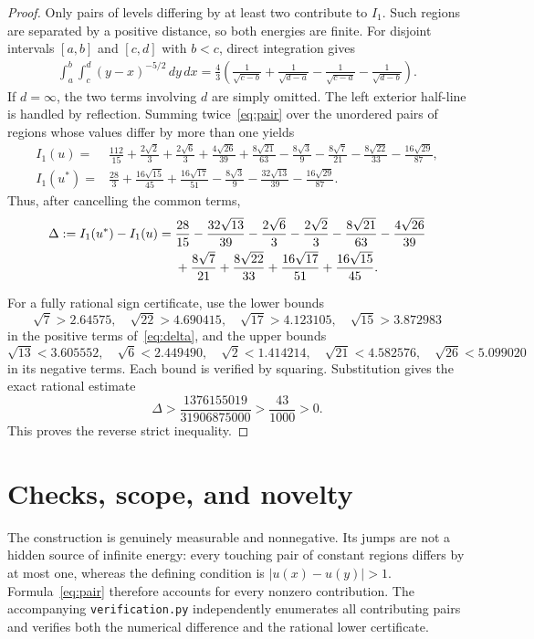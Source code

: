 \documentclass[11pt]{article}
\begin{document}
\begin{proof}
Only pairs of levels differing by at least two contribute to $I_1$.  Such
regions are separated by a positive distance, so both energies are finite.
For disjoint intervals $[a,b]$ and $[c,d]$ with $b<c$, direct integration
gives
\begin{align}\label{eq:pair}
 \int_a^b\int_c^d (y-x)^{-5/2}\,dy\,dx
 =\frac43\left(
 \frac1{\sqrt{c-b}}+\frac1{\sqrt{d-a}}
 -\frac1{\sqrt{c-a}}-\frac1{\sqrt{d-b}}
 \right).
\end{align}
If $d=\infty$, the two terms involving $d$ are simply omitted.  The left
exterior half-line is handled by reflection.  Summing twice~\eqref{eq:pair}
over the unordered pairs of regions whose values differ by more than one
yields
\begin{align*}
I_1(u)={}&\frac{112}{15}+\frac{2\sqrt2}{3}+\frac{2\sqrt6}{3}
+\frac{4\sqrt{26}}{39}+\frac{8\sqrt{21}}{63}
-\frac{8\sqrt3}{9}-\frac{8\sqrt7}{21}-\frac{8\sqrt{22}}{33}
-\frac{16\sqrt{29}}{87},\\
I_1(u^*)={}&\frac{28}{3}+\frac{16\sqrt{15}}{45}
+\frac{16\sqrt{17}}{51}-\frac{8\sqrt3}{9}
-\frac{32\sqrt{13}}{39}-\frac{16\sqrt{29}}{87}.
\end{align*}
Thus, after cancelling the common terms,
\begin{align}\label{eq:delta}
\Delta:=I_1(u^*)-I_1(u)
={}&\frac{28}{15}
-\frac{32\sqrt{13}}{39}-\frac{2\sqrt6}{3}-\frac{2\sqrt2}{3}
-\frac{8\sqrt{21}}{63}-\frac{4\sqrt{26}}{39} \notag\\
&+\frac{8\sqrt7}{21}+\frac{8\sqrt{22}}{33}
+\frac{16\sqrt{17}}{51}+\frac{16\sqrt{15}}{45}.
\end{align}

For a fully rational sign certificate, use the lower bounds
\[
\sqrt7>2.64575,\quad \sqrt{22}>4.690415,\quad
\sqrt{17}>4.123105,\quad \sqrt{15}>3.872983
\]
in the positive terms of~\eqref{eq:delta}, and the upper bounds
\[
\sqrt{13}<3.605552,\quad \sqrt6<2.449490,\quad
\sqrt2<1.414214,\quad \sqrt{21}<4.582576,\quad
\sqrt{26}<5.099020
\]
in its negative terms.  Each bound is verified by squaring.  Substitution
gives the exact rational estimate
\[
 \Delta>
 \frac{1376155019}{31906875000}>\frac{43}{1000}>0.
\]
This proves the reverse strict inequality.
\end{proof}

\section{Checks, scope, and novelty}

The construction is genuinely measurable and nonnegative.  Its jumps are
not a hidden source of infinite energy: every touching pair of constant
regions differs by at most one, whereas the defining condition is
$|u(x)-u(y)|>1$.  Formula~\eqref{eq:pair} therefore accounts for every
nonzero contribution.  The accompanying \texttt{verification.py} independently
enumerates all contributing pairs and verifies both the numerical difference
and the rational lower certificate.
\end{document}
